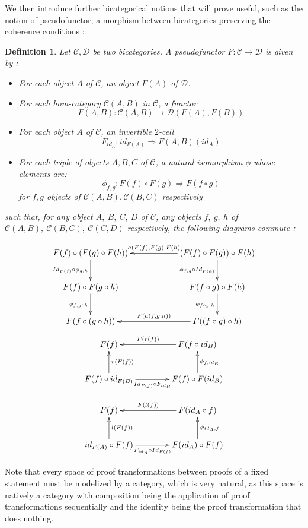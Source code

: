 \documentclass[a4paper, 12pt, twoside,openright]{report}
\newtheorem{definition}{Definition}
\begin{document}
We then introduce further bicategorical notions that will prove useful, such as the notion of pseudofunctor, a morphism between bicategories preserving the coherence conditions : 
\begin{definition}\label{definition/pseudofunctor}
Let $\mathcal{C}, \mathcal{D}$ be two bicategories. A pseudofunctor $F:\mathcal{C}\rightarrow \mathcal{D}$ is given by :
\begin{itemize}
\item For each object $A$ of $\mathcal{C}$, an object $F(A)$ of $\mathcal{D}$.
\item For each hom-category $\mathcal{C}(A,B)$ in $\mathcal{C}$, a functor $$F(A,B): \mathcal{C}(A,B) \rightarrow \mathcal{D}(F(A),F(B))$$
\item For each object $A$ of $\mathcal{C}$, an invertible $2$-cell $$F_{id_A}: id_{F(A)} \Rightarrow F(A,B)(id_A)$$
\item For each triple of objects $A,B,C$ of $\mathcal{C}$, a natural isomorphism $\phi$ whose elements are:$$\phi_{f,g} :F(f) \circ F(g) \Rightarrow F(f \circ g)$$ for $f,g$ objects of $\mathcal{C}(A,B), \mathcal{C}(B,C)$ respectively
\end{itemize}
such that, for any object $A,~B,~C,~D$ of $\mathcal{C}$, any objects $f,~g,~h$ of $\mathcal{C}(A,B),~\mathcal{C}(B,C),~\mathcal{C}(C,D)$ respectively, the following diagrams commute :

$$\xymatrix @-1.2pc {
F(f) \circ (F(g) \circ F(h))
\ar[dd]_-{Id_{F(f)} \circ \phi_{g,h} }
&&&&
(F(f) \circ F(g)) \circ F(h)
\ar[llll]_-{a(F(f),F(g),F(h)}
\ar[dd]_-{\phi_{f,g} \circ Id_{F(h)}}
\\
\\
F(f) \circ F(g \circ h)
\ar[dd]_-{\phi_{f,g \circ h} }
&&&&
F(f \circ g) \circ F(h)
\ar[dd]_-{\phi_{f \circ g, h} }
\\
\\
F(f\circ(g\circ h))
&&&&
F((f \circ g) \circ h)
\ar[llll]_-{F(a(f,g,h))}
}
$$
$$
\xymatrix @-1.2pc {
F(f)
&&&
F(f \circ id_B)
\ar[lll]_-{F(r(f))}
\\
\\
F(f) \circ id_{F(B)}
\ar[uu]_-{r(F(f))}
\ar[rrr]_-{ Id_{F(f)}  \circ F_{id_B} }
&&&
F(f) \circ F(id_B)
\ar[uu]_-{\phi_{f, id_B}}
}
$$

$$
\xymatrix @-1.2pc {
F(f)
&&&
F(id_A \circ f )
\ar[lll]_-{F(l(f))}
\\
\\
 id_{F(A)} \circ F(f) 
\ar[uu]_-{l(F(f))}
\ar[rrr]_-{ F_{id_A}  \circ Id_{F(f)}  }
&&&
 F(id_A) \circ F(f) 
\ar[uu]_-{\phi_{id_A, f}}
}
$$
\end{definition}
Note that every space of  proof transformations between proofs of a fixed statement must be modelized by a category, which is very natural, as this space is natively a category with composition being the application of proof transformations sequentially and the identity being the proof transformation that does nothing. \\
\end{document}
